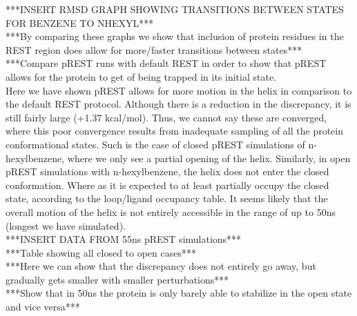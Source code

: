 \documentclass[journal=jctcce,manuscript=article]{achemso}
\begin{document}
\begin{suppinfo}
***INSERT RMSD GRAPH SHOWING TRANSITIONS BETWEEN STATES FOR BENZENE TO NHEXYL***\\
***By comparing these graphs we show that inclusion of protein residues in the REST region does allow for more/faster transitions between states***\\
***Compare pREST runs with default REST in order to show that pREST allows for the protein to get of being trapped in its initial state.\\

Here we have shown pREST allows for more motion in the helix in comparison to the default REST protocol.
Although there is a reduction in the discrepancy, it is still fairly large (+1.37 kcal/mol).
Thus, we cannot say these are converged, where this poor convergence results from inadequate sampling of all the protein conformational states.
Such is the case of closed pREST simulations of n-hexylbenzene, where we only see a partial opening of the helix.
Similarly, in open pREST simulations with n-hexylbenzene, the helix does not enter the closed conformation.
Where as it is expected to at least partially occupy the closed state, according to the loop/ligand occupancy table.
It seems likely that the overall motion of the helix is not entirely accessible in the range of up to 50ns (longest we have simulated).\\

***INSERT DATA FROM 55ns pREST simulations***\\
***Table showing all closed to open cases***\\
***Here we can show that the discrepancy does not entirely go away, but gradually gets smaller with smaller perturbations***\\
***Show that in 50ns the protein is only barely able to stabilize in the open state and vice versa***\\




\end{suppinfo}

\clearpage
\end{document}
